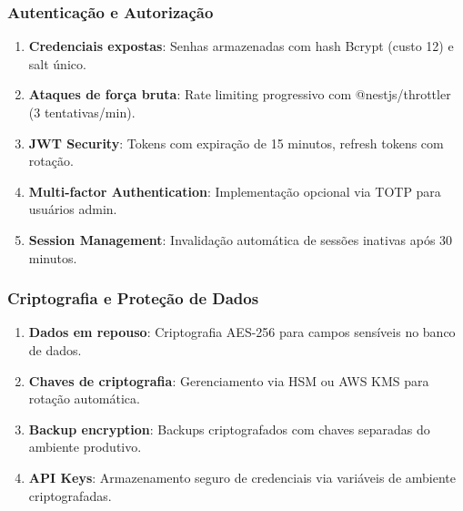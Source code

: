 \documentclass[12pt, a4paper]{article}
\begin{document}
\begin{spacing}{1.5}
\subsubsection{Autenticação e Autorização}
\begin{spacing}{1.5}
\begin{enumerate}[label=\alph*)]
    \item \textbf{Credenciais expostas}: Senhas armazenadas com hash Bcrypt (custo 12) e salt único.
    \item \textbf{Ataques de força bruta}: Rate limiting progressivo com @nestjs/throttler (3 tentativas/min).
    \item \textbf{JWT Security}: Tokens com expiração de 15 minutos, refresh tokens com rotação.
    \item \textbf{Multi-factor Authentication}: Implementação opcional via TOTP para usuários admin.
    \item \textbf{Session Management}: Invalidação automática de sessões inativas após 30 minutos.
\end{enumerate}
\end{spacing}

\subsubsection{Criptografia e Proteção de Dados}
\begin{spacing}{1.5}
\begin{enumerate}[label=\alph*)]
    \item \textbf{Dados em repouso}: Criptografia AES-256 para campos sensíveis no banco de dados.
    \item \textbf{Chaves de criptografia}: Gerenciamento via HSM ou AWS KMS para rotação automática.
    \item \textbf{Backup encryption}: Backups criptografados com chaves separadas do ambiente produtivo.
    \item \textbf{API Keys}: Armazenamento seguro de credenciais via variáveis de ambiente criptografadas.
\end{enumerate}
\end{spacing}


\end{spacing}
\end{document}
